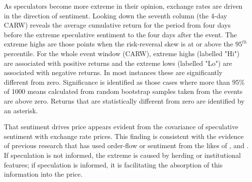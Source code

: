 \documentclass[preprint,12pt,authoryear]{elsarticle}
\begin{document}
As speculators become more extreme in their opinion, exchange rates are driven in the direction of sentiment. Looking down the seventh column (the 4-day CARW) reveals the average cumulative return for the period from four days before the extreme speculative sentiment to the four days after the event.   The extreme highs are those points when the risk-reversal skew is at or above the $95^{th}$ percentile.  For the whole event window (CARW), extreme highs (labelled "Hi") are associated with positive returns and the extreme lows (labelled "Lo") are associated with negative returns. In most instances these are significantly different from zero. Significance is identified as those cases where more than 95\% of 1000 means calculated from random bootstrap samples taken from the events are above zero.   Returns that are statistically different from zero are identified by an asterisk. 

That sentiment drives price appears evident from the covariance of speculative sentiment with exchange rate prices. This finding is consistent with the evidence of previous research that has used order-flow or sentiment from the likes of \citet{Evans2002Order}, \citet{FuturesSanders} and \citet{FuturesWang}. If speculation is not informed, the extreme is caused by herding or institutional features; if speculation is informed, it is facilitating the absorption of this information into the price. 
\end{document}
